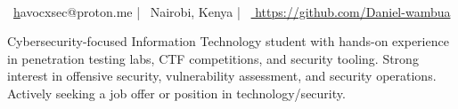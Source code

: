 \documentclass[]{resume-format}
\begin{document}
%


\setlength\fboxsep{10pt}%

\begingroup

\noindent
\begin{tcolorbox}[colback=headerbg, colframe=headerbg, arc=4mm, boxrule=0pt, left=0pt, right=0pt, top=6mm, bottom=6mm, width=\textwidth, enlarge left by=0mm, enlarge right by=0mm]
  \color{white} %
  \begin{center} %
    \\[2mm] %
    \faEnvelope~\href{mailto:havocxsec@proton.me}havocxsec@proton.me %
    \quad|\quad %
    \faMapMarker~Nairobi, Kenya %
    \quad|\quad %
    \faLink~\href{ https://github.com/Daniel-wambua }{ https://github.com/Daniel-wambua } %
  \end{center} %
\end{tcolorbox}
\endgroup
\vspace{0mm} %



\begin{cvpersonalstatement}
  \item { Cybersecurity-focused Information Technology student with hands-on experience in
penetration testing labs, CTF competitions, and security tooling.
Strong interest in offensive security, vulnerability assessment, and security operations.
Actively seeking a job offer or position in technology/security.
 }
\end{cvpersonalstatement}


\end{document}
